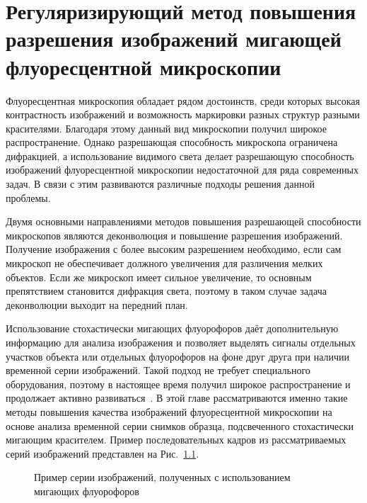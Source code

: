 \chapter{Регуляризирующий метод повышения разрешения изображений мигающей флуоресцентной микроскопии}\label{ch:ch1}

Флуоресцентная микроскопия обладает рядом достоинств, среди которых высокая контрастность изображений и возможность маркировки разных структур разными красителями. Благодаря этому данный вид микроскопии получил широкое распространение. Однако разрешающая способность микроскопа ограничена дифракцией, а использование видимого света делает разрешающую способность изображений флуоресцентной микроскопии недостаточной для ряда современных задач. В связи с этим развиваются различные подходы решения данной проблемы.

Двумя основными направлениями методов повышения разрешающей способности микроскопов являются деконволюция и повышение разрешения изображений. Получение изображения с более высоким разрешением необходимо, если сам микроскоп не обеспечивает должного увеличения для различения мелких объектов. Если же микроскоп имеет сильное увеличение, то основным препятствием становится дифракция света, поэтому в таком случае задача деконволюции выходит на передний план.

Использование стохастически мигающих флуорофоров даёт дополнительную информацию для анализа изображения и позволяет выделять сигналы отдельных участков объекта или отдельных флуорофоров на фоне друг друга при наличии временной серии изображений. Такой подход не требует специального оборудования, поэтому в настоящее время получил широкое распространение и продолжает активно развиваться~\cite{мишин2019флуоресцентная}. В этой главе рассматриваются именно такие методы повышения качества изображений флуоресцентной микроскопии на основе анализа временной серии снимков образца, подсвеченного стохастически мигающим красителем. Пример последовательных кадров из рассматриваемых серий изображений представлен на Рис.~\ref{fig:blinking-samples}.

\begin{figure}[ht]
	\caption{Пример серии изображений, полученных с использованием мигающих флуорофоров}
	\label{fig:blinking-samples}
\end{figure}

